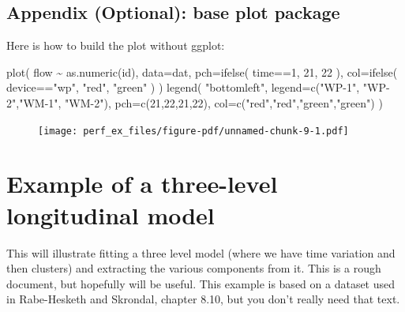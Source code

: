 \documentclass[
  letterpaper,
  DIV=11,
  numbers=noendperiod]{scrreprt}
\newenvironment{Shaded}{\begin{snugshade}}{\end{snugshade}}
\newcommand{\AttributeTok}[1]{\textcolor[rgb]{0.49,0.56,0.16}{#1}}
\newcommand{\DecValTok}[1]{\textcolor[rgb]{0.25,0.63,0.44}{#1}}
\newcommand{\FunctionTok}[1]{\textcolor[rgb]{0.02,0.16,0.49}{#1}}
\newcommand{\NormalTok}[1]{\textcolor[rgb]{0.00,0.44,0.13}{#1}}
\newcommand{\SpecialCharTok}[1]{\textcolor[rgb]{0.25,0.44,0.63}{#1}}
\newcommand{\StringTok}[1]{\textcolor[rgb]{0.25,0.44,0.63}{#1}}
\begin{document}
\hypertarget{appendix-optional-base-plot-package}{%
\section{Appendix (Optional): base plot
package}\label{appendix-optional-base-plot-package}}

Here is how to build the plot without ggplot:

\begin{Shaded}
\begin{Highlighting}[]
\FunctionTok{plot}\NormalTok{( flow }\SpecialCharTok{\textasciitilde{}} \FunctionTok{as.numeric}\NormalTok{(id), }\AttributeTok{data=}\NormalTok{dat, }\AttributeTok{pch=}\FunctionTok{ifelse}\NormalTok{( time}\SpecialCharTok{==}\DecValTok{1}\NormalTok{, }\DecValTok{21}\NormalTok{, }\DecValTok{22}\NormalTok{ ),}
      \AttributeTok{col=}\FunctionTok{ifelse}\NormalTok{( device}\SpecialCharTok{==}\StringTok{"wp"}\NormalTok{, }\StringTok{"red"}\NormalTok{, }\StringTok{"green"}\NormalTok{ ) )}
\FunctionTok{legend}\NormalTok{( }\StringTok{"bottomleft"}\NormalTok{, }\AttributeTok{legend=}\FunctionTok{c}\NormalTok{(}\StringTok{"WP{-}1"}\NormalTok{, }\StringTok{"WP{-}2"}\NormalTok{,}\StringTok{"WM{-}1"}\NormalTok{, }\StringTok{"WM{-}2"}\NormalTok{),}
        \AttributeTok{pch=}\FunctionTok{c}\NormalTok{(}\DecValTok{21}\NormalTok{,}\DecValTok{22}\NormalTok{,}\DecValTok{21}\NormalTok{,}\DecValTok{22}\NormalTok{),}
        \AttributeTok{col=}\FunctionTok{c}\NormalTok{(}\StringTok{"red"}\NormalTok{,}\StringTok{"red"}\NormalTok{,}\StringTok{"green"}\NormalTok{,}\StringTok{"green"}\NormalTok{) )}
\end{Highlighting}
\end{Shaded}

\begin{figure}[H]

{\centering \texttt{[image: perf\_ex\_files/figure-pdf/unnamed-chunk-9-1.pdf]}

}

\end{figure}

\hypertarget{example-of-a-three-level-longitudinal-model}{%
\chapter{Example of a three-level longitudinal
model}\label{example-of-a-three-level-longitudinal-model}}

This will illustrate fitting a three level model (where we have time
variation and then clusters) and extracting the various components from
it. This is a rough document, but hopefully will be useful. This example
is based on a dataset used in Rabe-Hesketh and Skrondal, chapter 8.10,
but you don't really need that text.
\end{document}

